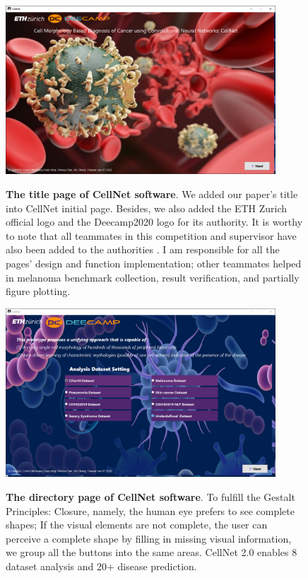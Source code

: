 \begin{figure}[t]
\begin{center}
\includegraphics[height=0.3\textheight,width=0.9\textwidth]{thesis-template-master/images/cellnet1page.PNG}
\label{fig:cellnet}
\end{center}
\caption{ \textbf{The title page of CellNet software}. We added our paper's title into CellNet initial page. Besides, we also added the ETH Zurich official logo and the Deecamp2020 logo for its authority. It is worthy to note that all teammates in this competition and  supervisor have also been added to the authorities . I am responsible for all the pages' design and function implementation; other teammates helped in melanoma benchmark collection, result verification, and partially figure plotting.}
\end{figure}


\begin{figure}[t]
\begin{center}
\includegraphics[height=0.3\textheight,width=0.9\textwidth]{thesis-template-master/images/cellnet2page.PNG}
\label{fig:cellnet}
\end{center}
\caption{ \textbf{The directory page of CellNet software}. To fulfill the Gestalt Principles: Closure, namely, the human eye prefers to see complete shapes; If the visual elements are not complete, the user can perceive a complete shape by filling in missing visual information, we group all the buttons into the same areas. CellNet 2.0 enables 8 dataset analysis and 20+ disease prediction.}
\end{figure}


